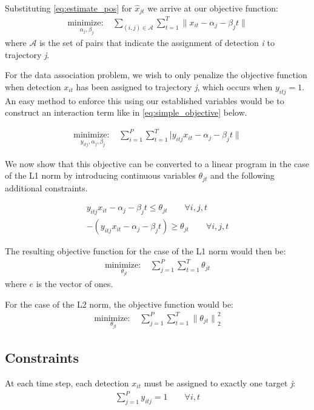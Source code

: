 \documentclass[journal]{IEEEtran}
\begin{document}
Substituting \eqref{eq:estimate_pos} for $\hat{x}_{jt}$ we arrive at our objective function:
\begin{align}
\underset{\alpha_{j}, \beta_{j}}{\text{minimize: }} & \sum_{(i,j)\in \mathcal{A}} \sum_{t=1}^{T} \|x_{it} - \alpha_{j} - \beta_{j}t\| 
\end{align}
where $\mathcal{A}$ is the set of pairs that indicate the assignment of detection \textit{i} to trajectory \textit{j}.
 
For the data association problem, we wish to only penalize the objective function when detection $x_{it}$ has been assigned to trajectory \textit{j}, which occurs when $y_{itj}=1$. An easy method to enforce this using our established variables would be to construct an interaction term like in \eqref{eq:simple_objective} below. 

\begin{align}\label{eq:simple_objective}
\underset{y_{itj}, \alpha_{j}, \beta_{j}}{\text{minimize: }} & \sum_{i=1}^{P} \sum_{t=1}^{T} |y_{itj}x_{it} - \alpha_{j} - \beta_{j}t\|
\end{align}

We now show that this objective can be converted to a linear program in the case of the L1 norm by introducing continuous variables $\theta_{jt}$ and the following additional constraints. 

\begin{align}
y_{itj}x_{it} - \alpha_{j} - \beta_{j}t \leq \theta_{jt} \qquad \forall i,j,t\\
-(y_{itj}x_{it} - \alpha_{j} - \beta_{j}t) \geq \theta_{jt} \qquad \forall i,j,t
\end{align}

The resulting objective function for the case of the L1 norm would then be:
\begin{align}
\underset{\theta_{jt}}{\text{minimize: }} & \sum_{j=1}^{P} \sum_{t=1}^{T} \theta_{jt}
\end{align}
where $e$ is the vector of ones. 

For the case of the L2 norm, the objective function would be:
\begin{align}
\underset{\theta_{jt}}{\text{minimize: }} & \sum_{j=1}^{P} \sum_{t=1}^{T} {\|\theta_{jt}\|}^{2}_{2}
\end{align}


\subsection{Constraints}
At each time step, each detection $x_{it}$ must be assigned to exactly one target \textit{j}:
\begin{align}
\sum_{j=1}^{P} y_{itj} = 1 \qquad \forall i,t
\end{align}
\end{document}
